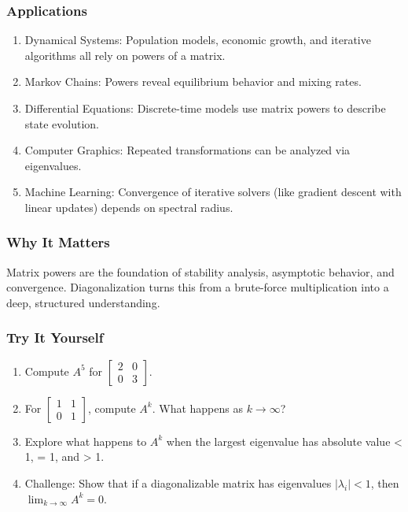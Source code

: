 \documentclass[
  letterpaper,
  DIV=11,
  numbers=noendperiod]{scrreprt}
\providecommand{\tightlist}{%
  \setlength{\itemsep}{0pt}\setlength{\parskip}{0pt}}
\begin{document}
\subsubsection{Applications}\label{applications-27}

\begin{enumerate}
\def\labelenumi{\arabic{enumi}.}
\tightlist
\item
  Dynamical Systems: Population models, economic growth, and iterative
  algorithms all rely on powers of a matrix.
\item
  Markov Chains: Powers reveal equilibrium behavior and mixing rates.
\item
  Differential Equations: Discrete-time models use matrix powers to
  describe state evolution.
\item
  Computer Graphics: Repeated transformations can be analyzed via
  eigenvalues.
\item
  Machine Learning: Convergence of iterative solvers (like gradient
  descent with linear updates) depends on spectral radius.
\end{enumerate}

\subsubsection{Why It Matters}\label{why-it-matters-61}

Matrix powers are the foundation of stability analysis, asymptotic
behavior, and convergence. Diagonalization turns this from a brute-force
multiplication into a deep, structured understanding.

\subsubsection{Try It Yourself}\label{try-it-yourself-64}

\begin{enumerate}
\def\labelenumi{\arabic{enumi}.}
\tightlist
\item
  Compute \(A^5\) for \(\begin{bmatrix} 2 & 0 \\ 0 & 3 \end{bmatrix}\).
\item
  For \(\begin{bmatrix} 1 & 1 \\ 0 & 1 \end{bmatrix}\), compute \(A^k\).
  What happens as \(k \to \infty\)?
\item
  Explore what happens to \(A^k\) when the largest eigenvalue has
  absolute value \textless{} 1, = 1, and \textgreater{} 1.
\item
  Challenge: Show that if a diagonalizable matrix has eigenvalues
  \(|\lambda_i| < 1\), then \(\lim_{k \to \infty} A^k = 0\).
\end{enumerate}
\end{document}
